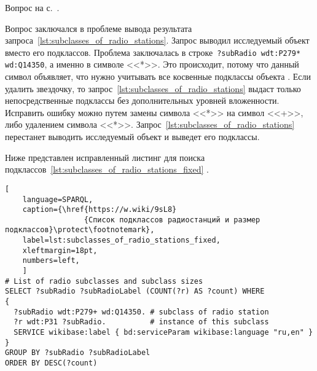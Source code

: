 \newpage
\hfil{}\hfil%
\begin{task}
    \label{answer:radio_stations}

    \AnswerBackref Вопрос на с.~\pageref{question:radio}. 

Вопрос заключался в проблеме вывода результата запроса~\ref{lst:subclasses_of_radio_stations}. Запрос выводил исследуемый объект  вместо его подклассов. Проблема заключалась в строке~\lstinline|?subRadio wdt:P279* wd:Q14350|, а именно в символе <<*>>. Это происходит, потому что данный символ объявляет, что нужно учитывать все косвенные подклассы объекта  . Если удалить звездочку, то запрос~\ref{lst:subclasses_of_radio_stations} выдаст только непосредственные подклассы  без дополнительных уровней вложенности. Исправить ошибку можно путем замены символа <<*>> на символ <<+>>, либо удалением символа <<*>>. Запрос~\ref{lst:subclasses_of_radio_stations} перестанет выводить исследуемый объект и выведет его подклассы.

Ниже представлен исправленный листинг для поиска подклассов~\ref{lst:subclasses_of_radio_stations_fixed} .

\begin{lstlisting}[ 
    language=SPARQL,
    caption={\href{https://w.wiki/9sL8}
                  {Список подклассов радиостанций и размер подклассов}\protect\footnotemark},
    label=lst:subclasses_of_radio_stations_fixed,
    xleftmargin=18pt,
    numbers=left,
    ]
# List of radio subclasses and subclass sizes
SELECT ?subRadio ?subRadioLabel (COUNT(?r) AS ?count) WHERE 
{
  ?subRadio wdt:P279+ wd:Q14350. # subclass of radio station
  ?r wdt:P31 ?subRadio.          # instance of this subclass
  SERVICE wikibase:label { bd:serviceParam wikibase:language "ru,en" }
}
GROUP BY ?subRadio ?subRadioLabel
ORDER BY DESC(?count)
\end{lstlisting}%

\end{task}

